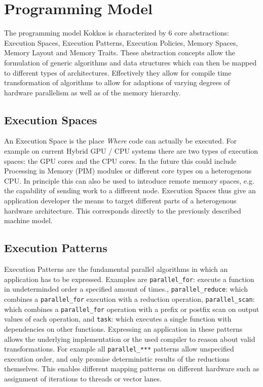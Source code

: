 
\chapter{Programming Model}

The programming model Kokkos is characterized by 6 core abstractions: Execution Spaces, Execution Patterns, Execution Policies, Memory Spaces, Memory Layout and Memory Traits. 
These abstraction concepts allow the formulation of generic algorithms and data structures which can then be mapped to different types of architectures. 
Effectively they allow for compile time transformation of algorithms to allow for adaptions of varying degrees of hardware parallelism as well as of the memory hierarchy. 

\section{Execution Spaces}

An Execution Space is the place {\it Where} code can actually be executed. 
For example on current Hybrid GPU / CPU systems there are two types of execution spaces: the GPU cores and the CPU cores. 
In the future this could include Processing in Memory (PIM) modules or different core types on a heterogenous CPU.
In principle this can also be used to introduce remote memory spaces, e.g. the capability of sending work to a different node.
Execution Spaces thus give an application developer the means to target different parts of a heterogenous hardware architecture.
This corresponds directly to the previously described machine model.

\section{Execution Patterns}

Execution Patterns are the fundamental parallel algorithms in which an application has to be expressed.
Examples are \lstinline|parallel_for|: execute a function in undeterminded order a specified amount of times.,
\lstinline|parallel_reduce|: which combines a \lstinline|parallel_for| execution with a reduction operation,
\lstinline|parallel_scan|: which combines a \lstinline|parallel_for| operation with a prefix or postfix scan on output values of each operation, and
\lstinline|task|: which executes a single function with dependencies on other functions.
Expressing an application in these patterns allows the underlying implementation or the used compiler to reason about valid transformations.
For example all \lstinline|parallel_***| patterns allow unspecified execution order, and only promise deterministic results of the reductions themselves.
This enables different mapping patterns on different hardware such as assignment of iterations to threads or vector lanes. 

